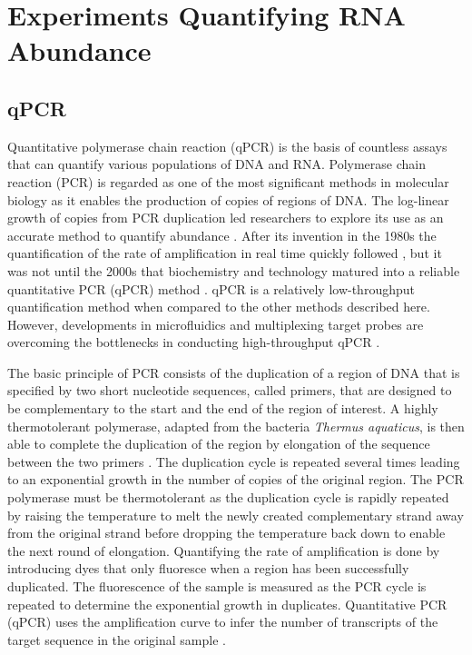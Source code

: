 \documentclass[../main.tex]{subfiles}
\begin{document}
\newpage


\section{Experiments Quantifying RNA Abundance}

\subsection{qPCR}

Quantitative polymerase chain reaction (qPCR) is the basis of countless assays that can quantify various populations of DNA and RNA.
Polymerase chain reaction (PCR) is regarded as one of the most significant methods in molecular biology as it enables the production of copies of regions of DNA. 
The log-linear growth of copies from PCR duplication led researchers to explore its use as an accurate method to quantify abundance \parencite{Saiki1988}.
After its invention in the 1980s the quantification of the rate of amplification in real time quickly followed \parencite{Holland1991}, but it was not until the 2000s that biochemistry and technology matured into a reliable quantitative PCR (qPCR) method \parencite{Walker2002}.
qPCR is a relatively low-throughput quantification method when compared to the other methods described here.
However, developments in microfluidics and multiplexing target probes are overcoming the bottlenecks in conducting high-throughput qPCR \parencite{Dreier2022}.

The basic principle of PCR consists of the duplication of a region of DNA that is specified by two short nucleotide sequences, called primers, that are designed to be complementary to the start and the end of the region of interest. 
A highly thermotolerant polymerase, adapted from the bacteria \textit{Thermus aquaticus}, is then able to complete the duplication of the region by elongation of the sequence between the two primers \parencite{Saiki1988}.
The duplication cycle is repeated several times leading to an exponential growth in the number of copies of the original region.
The PCR polymerase must be thermotolerant as the duplication cycle is rapidly repeated by raising the temperature to melt the newly created complementary strand away from the original strand before dropping the temperature back down to enable the next round of elongation. 
Quantifying the rate of amplification is done by introducing dyes that only fluoresce when a region has been successfully duplicated. 
The fluorescence of the sample is measured as the PCR cycle is repeated to determine the exponential growth in duplicates.
Quantitative PCR (qPCR) uses the amplification curve to infer the number of transcripts of the target sequence in the original sample \parencite{Holland1991}.
\end{document}
